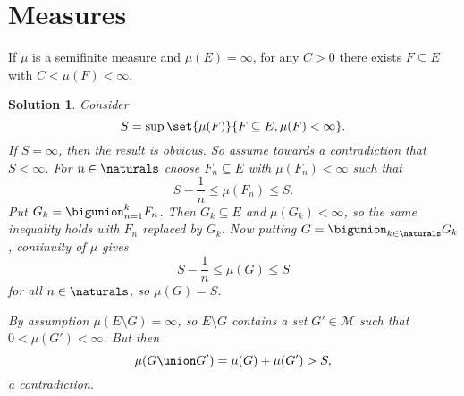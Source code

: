 \documentclass[article, a4paper, 11pt, oneside]{memoir}
\numberwithin{equation}{chapter}
\newcommand{\calM}{\mathcal{M}}
\theoremstyle{nonumberplain}
\newtheorem{solution}{Solution}
\begin{document}



\section{Measures}

\begin{exerciseframed*}[14]
    If $\mu$ is a semifinite measure and $\mu(E) = \infty$, for any $C > 0$ there exists $F \subseteq E$ with $C < \mu(F) < \infty$.
\end{exerciseframed*}

\begin{solution}
	Consider
	\begin{equation*}
		S = \sup \set{ \mu(F) }{ F \subseteq E, \mu(F) < \infty }.
	\end{equation*}
	If $S = \infty$, then the result is obvious. So assume towards a contradiction that $S < \infty$. For $n \in \naturals$ choose $F_n \subseteq E$ with $\mu(F_n) < \infty$ such that
	\begin{equation*}
		S - \frac{1}{n} \leq \mu(F_n) \leq S.
	\end{equation*}
	Put $G_k = \bigunion_{n=1}^k F_n$. Then $G_k \subseteq E$ and $\mu(G_k) < \infty$, so the same inequality holds with $F_n$ replaced by $G_k$. Now putting $G = \bigunion_{k \in \naturals} G_k$, continuity of $\mu$ gives
	\begin{equation*}
		S - \frac{1}{n} \leq \mu(G) \leq S
	\end{equation*}
	for all $n \in \naturals$, so $\mu(G) = S$.
	
	By assumption $\mu(E \setminus G) = \infty$, so $E \setminus G$ contains a set $G' \in \calM$ such that $0 < \mu(G') < \infty$. But then
	\begin{equation*}
		\mu(G \union G') = \mu(G) + \mu(G') > S,
	\end{equation*}
	a contradiction.
\end{solution}
\end{document}

